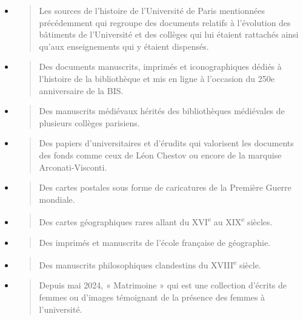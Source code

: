 \documentclass[a4paper,12pt,twoside]{book}
\begin{document}
\begin{itemize}
	\item
	\begin{quote}
		Les sources de l'histoire de l'Université de Paris mentionnées précédemment qui regroupe des
		documents relatifs à l'évolution des bâtiments de l'Université et des
		collèges qui lui étaient rattachés ainsi qu'aux enseignements qui y
		étaient dispensés.
	\end{quote}
	\item
	\begin{quote}
		Des documents manuscrits, imprimés et iconographiques dédiés à
		l'histoire de la bibliothèque et mis en ligne à l'occasion du 250e
		anniversaire de la BIS.
	\end{quote}
	\item
	\begin{quote}
		Des manuscrits médiévaux hérités des bibliothèques médiévales de
		plusieurs collèges parisiens.
	\end{quote}
	\item
	\begin{quote}
		Des papiers d'universitaires et d'érudits qui valorisent les documents
		des fonds comme ceux de Léon Chestov ou encore de la marquise
		Arconati-Visconti.
	\end{quote}
	\item
	\begin{quote}
		Des cartes postales sous forme de caricatures de la Première Guerre mondiale.
	\end{quote}
	\item
	\begin{quote}
		Des cartes géographiques rares allant du XVI\textsuperscript{e} au
		XIX\textsuperscript{e} siècles.
	\end{quote}
	\item
	\begin{quote}
		Des imprimés et manuscrits de l'école française de géographie.
	\end{quote}
	\item
	\begin{quote}
		Des manuscrits philosophiques clandestins du XVIII\textsuperscript{e}
		siècle.
	\end{quote}
	\item
	\begin{quote}
		Depuis mai 2024, « Matrimoine » qui est une collection d'écrits de
		femmes ou d'images témoignant de la présence des femmes à
		l'université. \\
	\end{quote}
\end{itemize}
\end{document}
